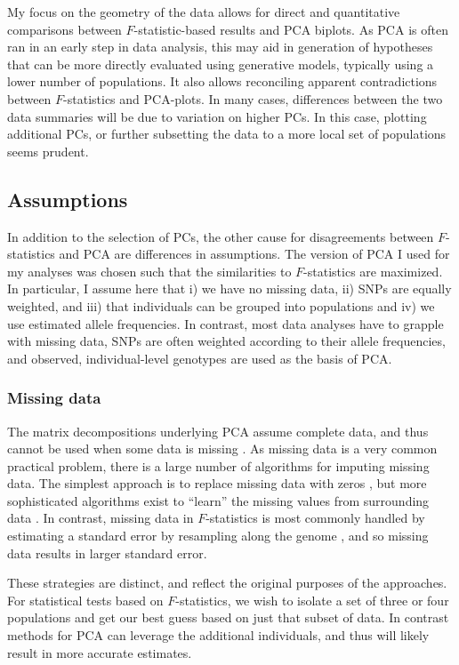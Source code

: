 \documentclass[12pt,fullpage, a4paper]{article}
\begin{document}
My focus on the geometry of the data allows for direct and quantitative comparisons between $F$-statistic-based results and PCA biplots. As PCA is often ran in an early step in data analysis, this may aid in generation of hypotheses that can be more directly evaluated using generative models, typically using a lower number of populations. It also allows reconciling apparent contradictions between $F$-statistics and PCA-plots. In many cases, differences between the two data summaries will be due to variation on higher PCs. In this case, plotting additional PCs, or further subsetting the data to a more local set of populations seems prudent. 

\subsection{Assumptions}
In addition to the selection of PCs, the other cause for disagreements between $F$-statistics and PCA are differences in assumptions. The version of PCA I used for my analyses was chosen such that the similarities to $F$-statistics are maximized. In particular, I assume here that i) we have no missing data, ii) SNPs are equally weighted, and iii) that individuals can be grouped into populations and iv) we use estimated allele frequencies. In contrast, most data analyses have to grapple with missing data, SNPs are often weighted according to their allele frequencies, and observed, individual-level genotypes are used as the basis of PCA.

\subsubsection{Missing data}
The matrix decompositions underlying PCA assume complete data, and thus cannot be used when some data is missing \citep{jolliffe2013}.  As missing data is a very common practical problem, there is a large number of algorithms for imputing missing data. The simplest approach is to replace missing data with zeros \citep[as implemented e.g. in][]{patterson2006}, but more sophisticated algorithms exist to ``learn'' the missing values from surrounding data \citep[e.g.][]{hastie2015, meisner2018, meisner2021}. In contrast, missing data in $F$-statistics is most commonly handled by estimating a standard error by resampling along the genome \citep{patterson2012}, and so missing data results in larger standard error. 

These strategies are distinct, and reflect the original purposes of the approaches. For statistical tests based on $F$-statistics, we wish to isolate a set of three or four populations and get our best guess based on just that subset of data. In contrast methods for PCA can leverage the additional individuals, and thus will likely result in more accurate estimates.
\end{document}
